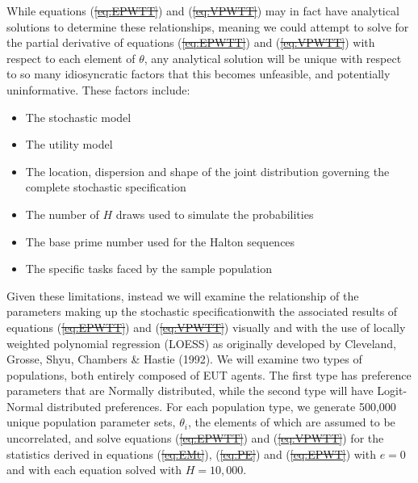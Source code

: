 \documentclass[11pt,a4paper]{report}
\providecommand{\DIFaddtex}[1]{{\protect\color{blue}\uwave{#1}}} %
\providecommand{\DIFdeltex}[1]{{\protect\color{red}\sout{#1}}}                      %
\providecommand{\DIFaddbegin}{} %
\providecommand{\DIFaddend}{} %
\providecommand{\DIFdelbegin}{} %
\providecommand{\DIFdelend}{} %
\providecommand{\DIFadd}[1]{\texorpdfstring{\DIFaddtex{#1}}{#1}} %
\providecommand{\DIFdel}[1]{\texorpdfstring{\DIFdeltex{#1}}{}} %
\newcommand{\DIFscaledelfig}{0.5}
\newlength{\DIFdelgraphicswidth} %
\newlength{\DIFdelgraphicsheight} %
\newcommand{\DIFaddincludegraphics}[2][]{{\color{blue}\fbox{\DIFOincludegraphics[#1]{#2}}}} %
\newcommand{\DIFdelincludegraphics}[2][]{%
\sbox{\DIFdelgraphicsbox}{\DIFOincludegraphics[#1]{#2}}%
\settoboxwidth{\DIFdelgraphicswidth}{\DIFdelgraphicsbox} %
\settoboxtotalheight{\DIFdelgraphicsheight}{\DIFdelgraphicsbox} %
\scalebox{\DIFscaledelfig}{%
\parbox[b]{\DIFdelgraphicswidth}{\usebox{\DIFdelgraphicsbox}\\[-\baselineskip] \rule{\DIFdelgraphicswidth}{0em}}\llap{\resizebox{\DIFdelgraphicswidth}{\DIFdelgraphicsheight}{%
\setlength{\unitlength}{\DIFdelgraphicswidth}%
\begin{picture}(1,1)%
\thicklines\linethickness{2pt} %
{\color[rgb]{1,0,0}\put(0,0){\framebox(1,1){}}}%
{\color[rgb]{1,0,0}\put(0,0){\line( 1,1){1}}}%
{\color[rgb]{1,0,0}\put(0,1){\line(1,-1){1}}}%
\end{picture}%
}\hspace*{3pt}}} %
} %
\DeclareRobustCommand{\DIFaddbegin}{\DIFOaddbegin \let\includegraphics\DIFaddincludegraphics} %
\DeclareRobustCommand{\DIFaddend}{\DIFOaddend \let\includegraphics\DIFOincludegraphics} %
\DeclareRobustCommand{\DIFdelbegin}{\DIFOdelbegin \let\includegraphics\DIFdelincludegraphics} %
\DeclareRobustCommand{\DIFdelend}{\DIFOaddend \let\includegraphics\DIFOincludegraphics} %
\begin{document}
While equations (\DIFdelbegin \DIFdel{\ref{eq:EPWTT}}\DIFdelend \DIFaddbegin \DIFadd{\ref{eq3:EPWTT}}\DIFaddend ) and (\DIFdelbegin \DIFdel{\ref{eq:VPWTT}}\DIFdelend \DIFaddbegin \DIFadd{\ref{eq3:VPWTT}}\DIFaddend ) may in fact have analytical solutions to determine these relationships, meaning we could attempt to solve for the partial derivative of equations (\DIFdelbegin \DIFdel{\ref{eq:EPWTT}}\DIFdelend \DIFaddbegin \DIFadd{\ref{eq3:EPWTT}}\DIFaddend ) and (\DIFdelbegin \DIFdel{\ref{eq:VPWTT}}\DIFdelend \DIFaddbegin \DIFadd{\ref{eq3:VPWTT}}\DIFaddend ) with respect to each element of $\theta$, any analytical solution will be unique with respect to so many idiosyncratic factors that this becomes unfeasible, and potentially uninformative.
These factors include:
\begin{itemize}
 \setlength\itemsep{-.25em}
	\item The stochastic model
	\item The utility model
	\item The location, dispersion and shape of the joint distribution governing the complete stochastic specification
	\item The number of $H$ draws used to simulate the probabilities
	\item The base prime number used for the Halton sequences
	\item The specific tasks faced by the sample population
\end{itemize}

Given these limitations, instead we will examine the relationship of the parameters making up the stochastic specification\DIFaddbegin \DIFadd{, i.e. the elements of $\theta$, }\DIFaddend with the associated results of equations (\DIFdelbegin \DIFdel{\ref{eq:EPWTT}}\DIFdelend \DIFaddbegin \DIFadd{\ref{eq3:EPWTT}}\DIFaddend ) and (\DIFdelbegin \DIFdel{\ref{eq:VPWTT}}\DIFdelend \DIFaddbegin \DIFadd{\ref{eq3:VPWTT}}\DIFaddend ) visually and with the use of locally weighted polynomial regression (LOESS) as originally developed by Cleveland, Grosse, Shyu, Chambers \& Hastie (1992).
We will examine two types of populations, both entirely composed of EUT agents.
The first type has preference parameters that are Normally distributed, while the second type will have Logit-Normal distributed preferences.
For each population type, we generate 500,000 unique population parameter sets, $\theta_i$, the elements of which are assumed to be uncorrelated, and solve equations (\DIFdelbegin \DIFdel{\ref{eq:EPWTT}}\DIFdelend \DIFaddbegin \DIFadd{\ref{eq3:EPWTT}}\DIFaddend ) and (\DIFdelbegin \DIFdel{\ref{eq:VPWTT}}\DIFdelend \DIFaddbegin \DIFadd{\ref{eq3:VPWTT}}\DIFaddend ) for the statistics derived in equations (\DIFdelbegin \DIFdel{\ref{eq:EMt}}\DIFdelend \DIFaddbegin \DIFadd{\ref{eq3:EMt}}\DIFaddend ), (\DIFdelbegin \DIFdel{\ref{eq:PE}}\DIFdelend \DIFaddbegin \DIFadd{\ref{eq3:PE}}\DIFaddend ) and (\DIFdelbegin \DIFdel{\ref{eq:EPWT}}\DIFdelend \DIFaddbegin \DIFadd{\ref{eq3:EWET}}\DIFaddend ) with $e=0$ and with each equation solved with $H=10,000$.
\end{document}

